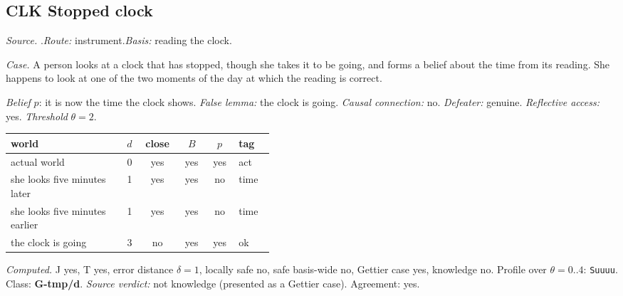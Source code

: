 \subsection*{CLK \enspace Stopped clock}
\noindent\textit{Source.} \citet{Russell1948}.\quad \textit{Route:} instrument.\quad \textit{Basis:} reading the clock.\par
\noindent\textit{Case.} A person looks at a clock that has stopped, though she takes it to be going, and forms a belief about the time from its reading. She happens to look at one of the two moments of the day at which the reading is correct.\par
\noindent\textit{Belief} $p$: it is now the time the clock shows.
 \textit{False lemma:} the clock is going. \textit{Causal connection:} no. \textit{Defeater:} genuine. \textit{Reflective access:} yes. \textit{Threshold} $\theta = 2$.\par
\begin{center}\begin{tabular}{@{}p{0.43\linewidth}rcccl@{}}
world & $d$ & close & $B$ & $p$ & tag \\ \midrule
actual world & 0 & yes & yes & yes & act \\
she looks five minutes later & 1 & yes & yes & no & time \\
she looks five minutes earlier & 1 & yes & yes & no & time \\
the clock is going & 3 & no & yes & yes & ok \\
\end{tabular}\end{center}
\noindent\textit{Computed.} J yes, T yes, error distance $\delta = 1$, locally safe no, safe basis-wide no, Gettier case yes, knowledge no. Profile over $\theta = 0..4$: \texttt{Suuuu}. Class: \textbf{G-tmp/d}.
 \textit{Source verdict:} not knowledge (presented as a Gettier case). Agreement: yes.
\par\medskip
{}
